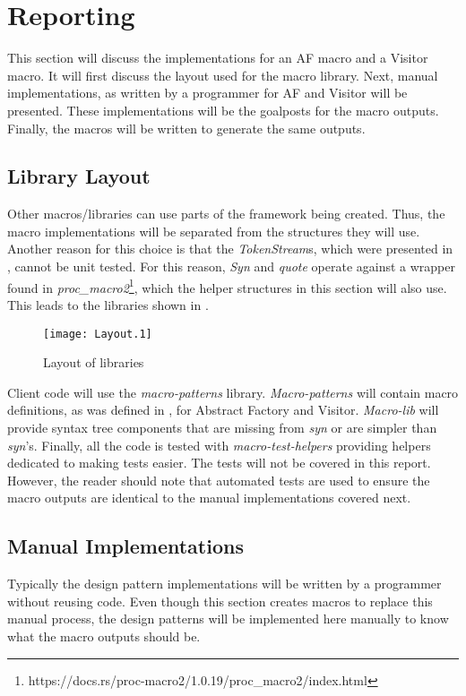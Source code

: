 \section{Reporting}
\label{sec:reporting}
This section will discuss the implementations for an AF macro and a Visitor macro.
It will first discuss the layout used for the macro library.
Next, manual implementations, as written by a programmer for AF and Visitor will be presented.
These implementations will be the goalposts for the macro outputs.
Finally, the macros will be written to generate the same outputs.

\subsection{Library Layout}
Other macros/libraries can use parts of the framework being created.
Thus, the macro implementations will be separated from the structures they will use.
Another reason for this choice is that the \textit{TokenStream}s, which were presented in , cannot be unit tested.
For this reason, \textit{Syn} and \textit{quote} operate against a wrapper found in \textit{proc\_macro2}\footnote{https://docs.rs/proc-macro2/1.0.19/proc\_macro2/index.html}, which the helper structures in this section will also use.
This leads to the libraries shown in .

\begin{figure}[h]
	\centering
	\texttt{[image: Layout.1]}
	\caption{Layout of libraries}
	\label{fig:LibraryLayout}
\end{figure}

Client code will use the \textit{macro-patterns} library.
\textit{Macro-patterns} will contain macro definitions, as was defined in , for Abstract Factory and Visitor.
\textit{Macro-lib} will provide syntax tree components that are missing from \textit{syn} or are simpler than \textit{syn}'s.
Finally, all the code is tested with \textit{macro-test-helpers} providing helpers dedicated to making tests easier.
The tests will not be covered in this report.
However, the reader should note that automated tests are used to ensure the macro outputs are identical to the manual implementations covered next.

\subsection{Manual Implementations}
\label{sec:manual-implementations}
Typically the design pattern implementations will be written by a programmer without reusing code.
Even though this section creates macros to replace this manual process, the design patterns will be implemented here manually to know what the macro outputs should be.

